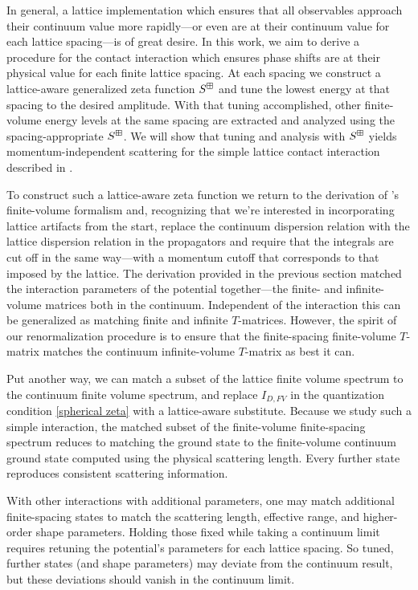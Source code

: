 In general, a lattice implementation which ensures that all observables approach their continuum value more rapidly---or even are at their continuum value for each lattice spacing---is of great desire.
In this work, we aim to derive a procedure for the contact interaction which ensures phase shifts are at their physical value for each finite lattice spacing.
At each spacing we construct a lattice-aware generalized \Luscher zeta function $S^{\boxplus}$ and tune the lowest energy at that spacing to the desired amplitude.
With that tuning accomplished, other finite-volume energy levels at the same spacing are extracted and analyzed using the spacing-appropriate $S^{\boxplus}$.
We will show that tuning and analysis with $S^{\boxplus}$ yields momentum-independent scattering for the simple lattice contact interaction described in .

To construct such a lattice-aware zeta function we return to the derivation of \Luscher's finite-volume formalism and, recognizing that we're interested in incorporating lattice artifacts from the start, replace the continuum dispersion relation with the lattice dispersion relation in the propagators and require that the integrals are cut off in the same way---with a momentum cutoff that corresponds to that imposed by the lattice.
The derivation provided in the previous section matched the interaction parameters of the potential together---the finite- and infinite-volume matrices both in the continuum.
Independent of the interaction this can be generalized as matching finite and infinite $T$-matrices.
However, the spirit of our renormalization procedure is to ensure that the finite-spacing finite-volume $T$-matrix matches the continuum infinite-volume $T$-matrix as best it can.

Put another way, we can match a subset of the lattice finite volume spectrum to the continuum finite volume spectrum, and replace $I_{D,FV}$ in the quantization condition \eqref{spherical zeta} with a lattice-aware substitute.
Because we study such a simple interaction, the matched subset of the finite-volume finite-spacing spectrum reduces to matching the ground state to the finite-volume continuum ground state computed using the physical scattering length.
Every further state reproduces consistent scattering information.

With other interactions with additional parameters, one may match additional finite-spacing states to match the scattering length, effective range, and higher-order shape parameters.
Holding those fixed while taking a continuum limit requires retuning the potential's parameters for each lattice spacing.
So tuned, further states (and shape parameters) may deviate from the continuum result, but these deviations should vanish in the continuum limit.


